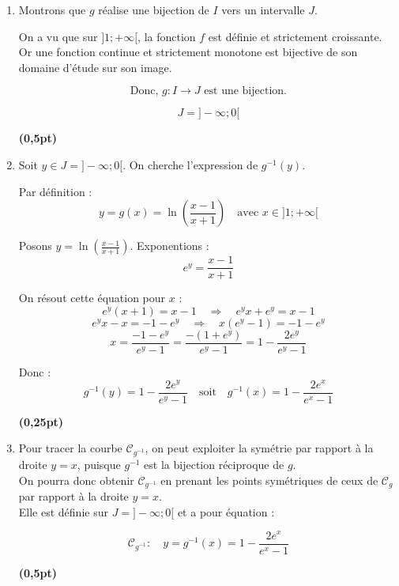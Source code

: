 \documentclass[12pt,a4paper]{article}
\begin{document}
\begin{enumerate}
    \item Montrons que \( g \) réalise une bijection de \( I \) vers un intervalle \( J \).

    On a vu que sur \( ]1 ; +\infty[ \), la fonction \( f \) est définie et strictement croissante.\\
    Or une fonction continue et strictement monotone est bijective de son domaine d’étude sur son image.

    \[
    \text{Donc, } g : I \to J \text{ est une bijection.}
    \]

    \[
    J = ]-\infty ; 0[
    \]

    \hfill \textbf{(0,5pt)}

    \item Soit \( y \in J = ]-\infty ; 0[ \). On cherche l'expression de \( g^{-1}(y) \).

    Par définition :
    \[
    y = g(x) = \ln\left( \frac{x - 1}{x + 1} \right) \quad \text{avec } x \in ]1 ; +\infty[
    \]

    Posons \( y = \ln\left( \frac{x - 1}{x + 1} \right) \). Exponentions :
    \[
    e^y = \frac{x - 1}{x + 1}
    \]

    On résout cette équation pour \( x \) :
    \[
    e^y(x + 1) = x - 1 \quad \Rightarrow \quad e^y x + e^y = x - 1
    \]
    \[
    e^y x - x = -1 - e^y \quad \Rightarrow \quad x(e^y - 1) = -1 - e^y
    \]
    \[
    x = \frac{-1 - e^y}{e^y - 1} = \frac{-(1 + e^y)}{e^y - 1} = 1 - \frac{2e^y}{e^y - 1}
    \]

    Donc :
    \[
    g^{-1}(y) = 1 - \frac{2e^y}{e^y - 1}
    \quad \text{soit} \quad
    g^{-1}(x) = 1 - \frac{2e^x}{e^x - 1}
    \]

    \hfill \textbf{(0,25pt)}

    \item Pour tracer la courbe \( \mathcal{C}_{g^{-1}} \), on peut exploiter la symétrie par rapport à la droite \( y = x \), puisque \( g^{-1} \) est la bijection réciproque de \( g \).\\

    On pourra donc obtenir \( \mathcal{C}_{g^{-1}} \) en prenant les points symétriques de ceux de \( \mathcal{C}_g \) par rapport à la droite \( y = x \).\\

    Elle est définie sur \( J = ]-\infty ; 0[ \) et a pour équation :

    \[
    \mathcal{C}_{g^{-1}} : \quad y = g^{-1}(x) = 1 - \frac{2e^x}{e^x - 1}
    \]

    \hfill \textbf{(0,5pt)}
\end{enumerate}
\end{document}
